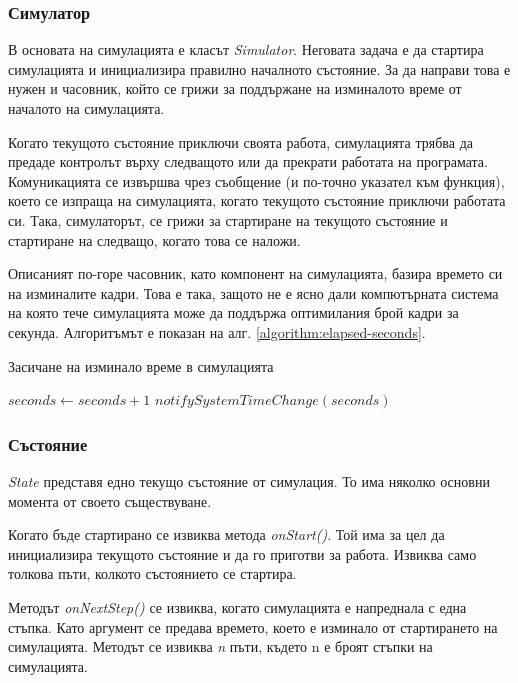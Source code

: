 		\subsubsection{Симулатор}		
		
		В основата на симулацията е класът \emph{Simulator}. Неговата задача е да стартира симулацията
		и инициализира правилно началното състояние. За да направи това е нужен и часовник, който се грижи
		за поддържане на изминалото време от началото на симулацията. 
		
		Когато текущото състояние приключи своята работа, симулацията трябва да предаде контролът върху следващото или да прекрати работата
		на програмата. Комуникацията се извършва чрез съобщение (и по-точно указател към функция), което
		се изпраща на симулацията, когато текущото състояние приключи работата си. Така, симулаторът,
		се грижи за стартиране на текущото състояние и стартиране на следващо, когато това се наложи.
		
		Описаният по-горе часовник, като компонент на симулацията, базира времето си
		на изминалите кадри. Това е така, защото не е ясно дали компютърната система
		на която тече симулацията може да поддържа оптимилания брой кадри за секунда.
		Алгоритъмът е показан на алг. \ref{algorithm:elapsed-seconds}.

		\begin{algorithm}				
			\caption{Засичане на изминало време в симулацията}				
			\label{algorithm:elapsed-seconds}
			\begin{algorithmic}
					\State $seconds\gets seconds+1$
					\State $notifySystemTimeChange(seconds)$
				\EndIf
			\end{algorithmic}
		\end{algorithm}
		
		\subsubsection{Състояние}					
		
		\emph{State} представя едно текущо състояние от симулация. То има няколко основни момента от своето съществуване.
		 
		Когато бъде стартирано се извиква метода \emph{onStart()}. Той има за цел да инициализира текущото състояние и да го приготви за работа.
		Извиква само толкова пъти, колкото състоянието се стартира. 
		
		Методът \emph{onNextStep()} се извиква, когато симулацията е напреднала 
		с една стъпка. Като аргумент се предава времето, което е изминало от стартирането на симулацията. 
		Методът се извиква \emph{n} пъти, където n е броят стъпки на симулацията. 
		
